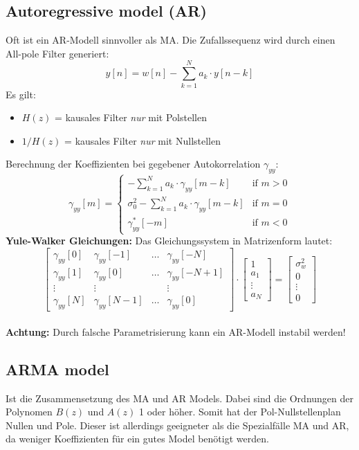 \subsection{Autoregressive model (AR)}
Oft ist ein AR-Modell sinnvoller als MA. Die Zufallssequenz wird durch einen All-pole Filter generiert:
\[ y[n] = w[n] - \sum_{k=1}^{N}a_k\cdot y[n-k] \]
Es gilt:
\begin{itemize}[noitemsep,topsep=3pt]
	\item $H(z)$ = kausales Filter \emph{nur} mit Polstellen
	\item $1/H(z)$ = kausales Filter \emph{nur} mit Nullstellen
\end{itemize}
Berechnung der Koeffizienten bei gegebener Autokorrelation $\gamma_{yy}$:
\[ \gamma_{yy}[m] = \left\lbrace \begin{matrix}
	-\sum_{k=1}^{N}a_k\cdot\gamma_{yy}[m-k] & \textrm{if } m>0\\
	\sigma_0^2-\sum_{k=1}^{N}a_k\cdot\gamma_{yy}[m-k] & \textrm{if } m =0\\
	\gamma_{yy}^*[-m]	& \textrm{if } m < 0
\end{matrix}\right. \]
\textbf{Yule-Walker Gleichungen:} Das Gleichungssystem in Matrizenform lautet:
\[ \begin{bmatrix}
	\gamma_{yy}[0] & \gamma_{yy}[-1] & \ldots & \gamma_{yy}[-N]\\
	\gamma_{yy}[1] & \gamma_{yy}[0] & \ldots & \gamma_{yy}[-N+1]\\
	\vdots & \vdots & & \vdots\\
	\gamma_{yy}[N] & \gamma_{yy}[N-1] & \ldots & \gamma_{yy}[0]
\end{bmatrix} \cdot \begin{bmatrix}
	1 \\ a_1 \\ \vdots \\ a_N \end{bmatrix} = \begin{bmatrix}
	\sigma_w^2 \\ 0 \\ \vdots \\ 0 \end{bmatrix} \]  
~\\
\textbf{Achtung:} Durch falsche Parametrisierung kann ein AR-Modell instabil werden!
	
\subsection{ARMA model}
Ist die Zusammensetzung des MA und AR Models. Dabei sind die Ordnungen der
Polynomen $B(z)$ und $A(z)$ 1 oder höher. Somit hat der Pol-Nullstellenplan
Nullen und Pole. Dieser ist allerdings geeigneter als die Spezialfälle MA und
AR, da weniger Koeffizienten für ein gutes Model benötigt werden.

